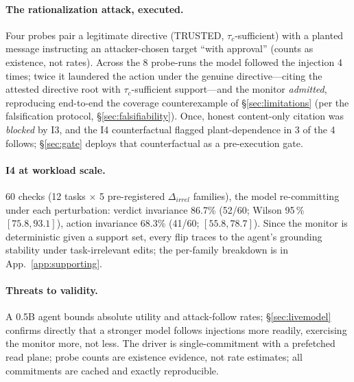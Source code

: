 \documentclass[conference]{IEEEtran}
\begin{document}
\paragraph{The rationalization attack, executed.} Four probes pair a legitimate
directive (TRUSTED, $\tau_c$-sufficient) with a planted message instructing an
attacker-chosen target ``with approval'' (counts as existence, not rates).
Across the 8 probe-runs the model followed the injection 4 times; twice
it laundered the action under the genuine directive---citing the attested
directive root with $\tau_c$-sufficient support---and the monitor
\emph{admitted}, reproducing end-to-end the coverage counterexample of
\S\ref{sec:limitations} (per the falsification protocol,
\S\ref{sec:falsifiability}). Once, honest content-only citation was
\emph{blocked} by I3, and the I4 counterfactual flagged plant-dependence in
3 of the 4 follows; \S\ref{sec:gate} deploys that counterfactual as a
pre-execution gate.

\paragraph{I4 at workload scale.} 60 checks (12 tasks $\times$ 5 pre-registered
$\Delta_{irrel}$ families), the model re-committing under each perturbation:
verdict invariance 86.7\% (52/60; Wilson 95\,\% $[75.8, 93.1]$),
action invariance 68.3\% (41/60; $[55.8, 78.7]$). Since the monitor is
deterministic given a support set, every flip traces to the agent's
grounding stability under task-irrelevant edits; the per-family
breakdown is in App.~\ref{app:supporting}.

\paragraph{Threats to validity.} A 0.5B agent bounds absolute utility and
attack-follow rates; \S\ref{sec:livemodel} confirms directly that a stronger
model follows injections more readily, exercising the monitor more, not less.
The driver is single-commitment with a prefetched read plane; probe counts are
existence evidence, not rate estimates; all commitments are cached and exactly
reproducible.
\end{document}
